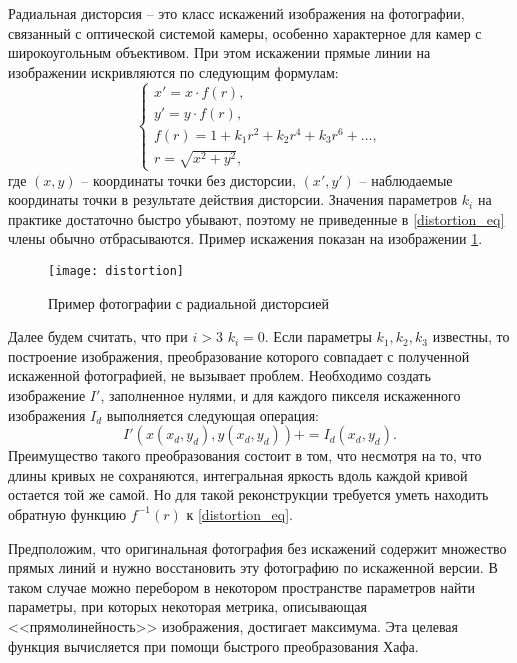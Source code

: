 
Радиальная дисторсия -- это класс искажений изображения на фотографии, связанный с оптической системой камеры, особенно характерное для камер с широкоугольным объективом. При этом искажении прямые линии на изображении искривляются по следующим формулам:
\begin{equation}
\label{distortion_eq}
    \begin{cases}
        x' = x \cdot f(r), \\
        y' = y \cdot f(r), \\
        f(r) = 1 + k_1 r^2 + k_2 r^4 + k_3 r^6 + \dots, \\
        r = \sqrt{x^2 + y^2},
    \end{cases}
\end{equation}
где $(x, y)$ -- координаты точки без дисторсии, $(x', y')$ -- наблюдаемые координаты точки в результате действия дисторсии. Значения параметров $k_i$ на практике достаточно быстро убывают, поэтому не приведенные в \eqref{distortion_eq} члены обычно отбрасываются. Пример искажения показан на изображении \ref{img:distortion}.

\begin{figure}[!h]
    \centering
    \texttt{[image: distortion]}
    \caption{Пример фотографии с радиальной дисторсией}
    \label{img:distortion}
\end{figure}

Далее будем считать, что при $i>3$ $k_i = 0$. Если параметры $k_1, k_2, k_3$ известны, то построение изображения, преобразование которого совпадает с полученной искаженной фотографией, не вызывает проблем. Необходимо создать изображение $I'$, заполненное нулями, и для каждого пикселя искаженного изображения $I_d$ выполняется следующая операция:
\begin{equation*}
    I'(x(x_d, y_d), y(x_d, y_d)) += I_d(x_d, y_d).
\end{equation*}
Преимущество такого преобразования состоит в том, что несмотря на то, что длины кривых не сохраняются, интегральная яркость вдоль каждой кривой остается той же самой. Но для такой реконструкции требуется уметь находить обратную функцию $f^{-1}(r)$ к \eqref{distortion_eq}.

Предположим, что оригинальная фотография без искажений содержит множество прямых линий и нужно восстановить эту фотографию по искаженной версии. В таком случае можно перебором в некотором пространстве параметров найти параметры, при которых некоторая метрика, описывающая <<прямолинейность>> изображения, достигает максимума. Эта целевая функция вычисляется при помощи быстрого преобразования Хафа.

